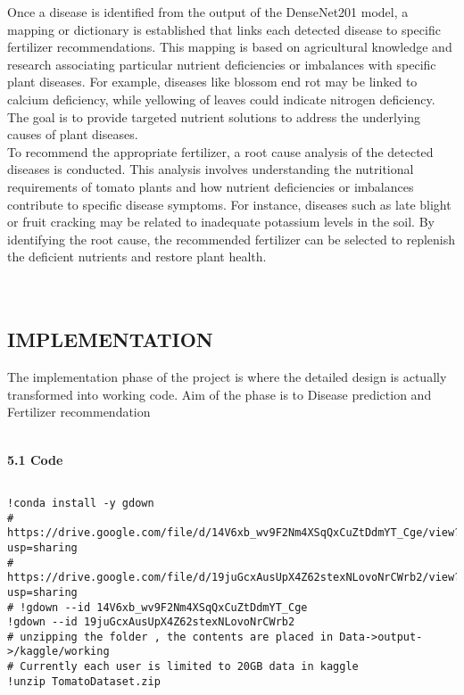 \documentclass[12pt, English]{article}
\begin{document}
\begin{normalsize}
Once a disease is identified from the output of the DenseNet201 model, a mapping or dictionary is established that links each detected disease to specific fertilizer recommendations. This mapping is based on agricultural knowledge and research associating particular nutrient deficiencies or imbalances with specific plant diseases. For example, diseases like blossom end rot may be linked to calcium deficiency, while yellowing of leaves could indicate nitrogen deficiency. The goal is to provide targeted nutrient solutions to address the underlying causes of plant diseases.\\
To recommend the appropriate fertilizer, a root cause analysis of the detected diseases is conducted. This analysis involves understanding the nutritional requirements of tomato plants and how nutrient deficiencies or imbalances contribute to specific disease symptoms. For instance, diseases such as late blight or fruit cracking may be related to inadequate potassium levels in the soil. By identifying the root cause, the recommended fertilizer can be selected to replenish the deficient nutrients and restore plant health.\\

\\\\



\newpage
\begin{center}
\section{ \Large IMPLEMENTATION }
\end{center}
The implementation phase of the project is where the detailed design is actually transformed into working code.  Aim of the phase is to Disease prediction and Fertilizer recommendation\\ \\
\begin{large}
\textbf{5.1 Code }\\
\end{large}

\begin{verbatim}

!conda install -y gdown
# https://drive.google.com/file/d/14V6xb_wv9F2Nm4XSqQxCuZtDdmYT_Cge/view?usp=sharing
# https://drive.google.com/file/d/19juGcxAusUpX4Z62stexNLovoNrCWrb2/view?usp=sharing
# !gdown --id 14V6xb_wv9F2Nm4XSqQxCuZtDdmYT_Cge
!gdown --id 19juGcxAusUpX4Z62stexNLovoNrCWrb2
# unzipping the folder , the contents are placed in Data->output->/kaggle/working 
# Currently each user is limited to 20GB data in kaggle 
!unzip TomatoDataset.zip


\end{verbatim}
\end{normalsize}
\end{document}
